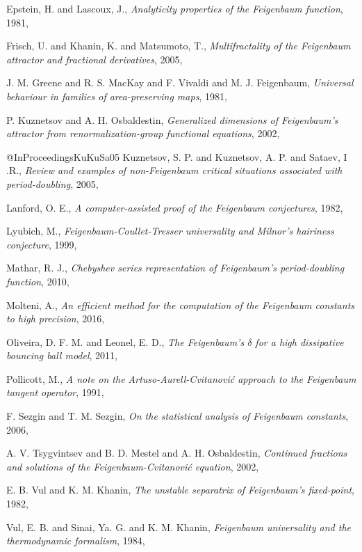 \begin{description}
{Epstein, H. and Lascoux, J.},
{\em Analyticity properties of the {Feigenbaum} function},
{1981},

{Frisch, U. and Khanin, K. and Matsumoto, T.},
{\em Multifractality of the {Feigenbaum} attractor and fractional derivatives},
{2005},

{J. M. Greene and R. S. MacKay and F. Vivaldi and M. J. Feigenbaum},
{\em Universal behaviour in families of area-preserving maps},
{1981},

{P. Kuznetsov and A. H. Osbaldestin},
{\em Generalized dimensions of {Feigenbaum}'s attractor from renormalization-group functional equations},
{2002},

@InProceedings{KuKuSa05}
{Kuznetsov, S. P. and Kuznetsov, A. P. and Sataev, I .R.},
{\em Review and examples of non-{Feigenbaum} critical situations associated with period-doubling},
{2005},

{{Lanford}, O. E.},
{\em A computer-assisted proof of the {Feigenbaum} conjectures},
{1982},

{Lyubich, M.},
{\em {Feigenbaum-Coullet-Tresser} universality and {Milnor}'s hairiness conjecture},
{1999},

{Mathar, R. J.},
{\em {Chebyshev} series representation of {Feigenbaum's} period-doubling function},
{2010},

{Molteni, A.},
{\em An efficient method for the computation of the {Feigenbaum} constants to high precision},
{2016},

{Oliveira, D. F. M. and Leonel, E. D.},
{\em The {Feigenbaum}'s {$\delta$} for a high dissipative bouncing ball model},
{2011},

{Pollicott, M.},
{\em A note on the {Artuso-Aurell-Cvitanovi{\'c}} approach to the {Feigenbaum} tangent operator},
{1991},

{F. Sezgin and T. M. Sezgin},
{\em On the statistical analysis of {Feigenbaum} constants},
{2006},

{A. V. Tsygvintsev and B. D. Mestel and A. H. Osbaldestin},
{\em Continued fractions and solutions of the {Feigenbaum-Cvitanovi{\'{c}}} equation},
{2002},

{E. B. Vul and K. M. Khanin},
{\em The unstable separatrix of {Feigenbaum}'s fixed-point},
{1982},

{Vul, E. B. and Sinai, Ya. G. and K. M. Khanin},
{\em Feigenbaum universality and the thermodynamic formalism},
{1984},


\end{description}
